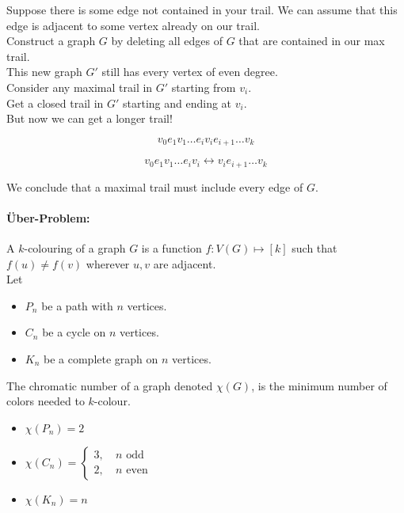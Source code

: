 \documentclass[a4paper, 11pt, twoside]{article}
\begin{document}
Suppose there is some edge not contained in your trail. We can assume that this edge is adjacent to some vertex already on our trail.\\

Construct a graph $G$ by deleting all edges of $G$ that are contained in our max trail.\\

This new graph $G'$ still has every vertex of even degree.\\

Consider any maximal trail in $G'$ starting from $v_i$.\\

Get a closed trail in $G'$ starting and ending at $v_i$.\\

But now we can get a longer trail!

\[v_0e_1v_1\dots e_iv_ie_{i+1}\dots v_k\]

\[v_0e_1v_1\dots e_iv_i \longleftrightarrow v_ie_{i+1}\dots v_k\]

We conclude that a maximal trail must include every edge of $G$.\\

\paragraph{\"Uber-Problem:} A $k$-colouring of a graph $G$ is a function $f: V(G)\longmapsto [k]$ such that $f(u)\not= f(v)$ wherever $u,v$ are adjacent.\\

Let 

\begin{itemize}
	\item $P_n$ be a path with $n$ vertices.
	\item $C_n$ be a cycle on $n$ vertices.
	\item $K_n$ be a complete graph on $n$ vertices.
\end{itemize}

The chromatic number of a graph denoted $\chi(G)$, is the minimum number of colors needed to $k$-colour.

\begin{itemize}
	\item $\chi(P_n)=2$
	\item $\chi(C_n)=\begin{cases}
		3,\ &n\text{ odd}\\
		2,\ &n\text{ even}
	\end{cases}$
	\item $\chi(K_n)=n$
\end{itemize}
\end{document}
